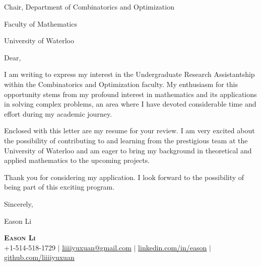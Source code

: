 \documentclass[letterpaper,11pt]{article}
\begin{document}

\qquad Chair, Department of Combinatorics and Optimization 

Faculty of Mathematics 

University of Waterloo
\newline

Dear,
\newline

I am writing to express my interest in the Undergraduate Research Assistantship within the Combinatorics and Optimization faculty. My enthusiasm for this opportunity stems from my profound interest in mathematics and its applications in solving complex problems, an area where I have devoted considerable time and effort during my academic journey.



Enclosed with this letter are my resume for your review. I am very excited about the possibility of contributing to and learning from the prestigious team at the University of Waterloo and am eager to bring my background in theoretical and applied mathematics to the upcoming projects.

Thank you for considering my application. I look forward to the possibility of being part of this exciting program.
\newline

Sincerely,
\newline

Eason Li

\newpage

\begin{center}
    \textbf{\Huge \scshape Eason Li} \\ \vspace{1pt}
    \small +1-514-518-1729 $|$ \href{liiiiyuxuan@gmail.com}{\underline{liiiiyuxuan@gmail.com}} $|$ 
    \href{https://www.linkedin.com/in/eason-li-539994276/}{\underline{linkedin.com/in/eason}} $|$
    \href{https://github.com/Liiiiyuxuan}{\underline{github.com/liiiiyuxuan}}
\end{center}
\end{document}
